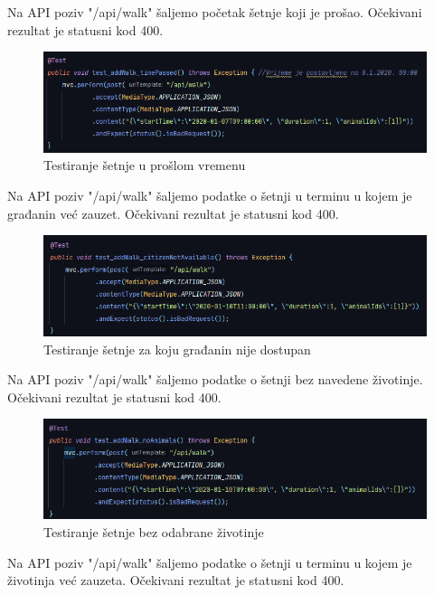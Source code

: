 	\noindent Na API poziv "/api/walk" šaljemo početak šetnje koji je prošao. Očekivani rezultat je statusni kod 400.

	\begin{figure}[H]
		\includegraphics[width=\linewidth]{slike/Testovi-7.png}
		\centering
		\caption{Testiranje šetnje u prošlom vremenu}
		\label{fig:testovi7}
	\end{figure}
	
	\noindent Na API poziv "/api/walk" šaljemo podatke o šetnji u terminu u kojem je građanin već zauzet. Očekivani rezultat je statusni kod 400.

	\begin{figure}[H]
		\includegraphics[width=\linewidth]{slike/Testovi-8.png}
		\centering
		\caption{Testiranje šetnje za koju građanin nije dostupan}
		\label{fig:testovi8}
	\end{figure}

	\noindent Na API poziv "/api/walk" šaljemo podatke o šetnji bez navedene životinje. Očekivani rezultat je statusni kod 400.

	\begin{figure}[H]
		\includegraphics[width=\linewidth]{slike/Testovi-9.png}
		\centering
		\caption{Testiranje šetnje bez odabrane životinje}
		\label{fig:testovi9}
	\end{figure}

	\noindent Na API poziv "/api/walk" šaljemo podatke o šetnji u terminu u kojem je životinja već zauzeta. Očekivani rezultat je statusni kod 400.
	
